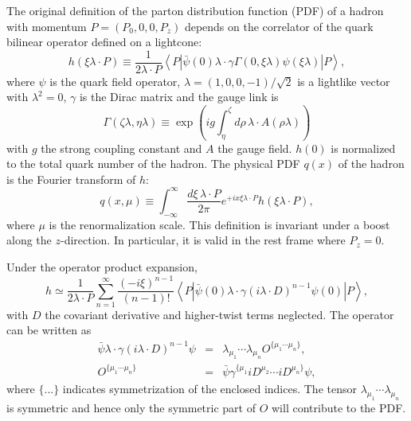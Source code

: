 
The original definition of the parton distribution function (PDF) of a
hadron with momentum $P=(P_0,0,0,P_z)$ depends on the correlator
of the quark bilinear operator defined on a lightcone:
%
\begin{equation}
h(\xi \lambda \cdot P) \equiv
  \frac{1}{2\lambda \cdot P}
  \left\langle P \left\vert
    \bar{\psi}(0) \lambda \cdot \gamma
    \Gamma \left(0,\xi \lambda \right) \psi(\xi \lambda)
  \right\vert P \right\rangle,  \label{eq:h-definition}
\end{equation}
%
where $\psi$ is the quark field operator, $\lambda=(1,0,0,-1)/\sqrt{2}$
is a lightlike vector with $\lambda^2=0$, $\gamma$ is the Dirac
matrix and the gauge link is
%
\begin{equation}
\Gamma \left( \zeta \lambda , \eta \lambda \right) \equiv
  \exp \left( ig \int_\eta^\zeta d\rho\,\lambda \cdot A(\rho \lambda) \right)
\end{equation}
%
with $g$ the strong coupling constant and $A$ the gauge field.
$h\left(0\right)$ is normalized to the total quark number of the hadron.
The physical PDF $q(x)$ of the hadron is the Fourier transform of $h$:
%
\begin{equation}
q(x,\mu) \equiv
  \int_{-\infty}^\infty \frac{d\xi \,\lambda \cdot P}{2\pi}
    e^{+ix \xi \lambda \cdot P} h(\xi \lambda \cdot P),  \label{one}
\end{equation}
%
where $\mu$ is the renormalization scale. This definition is invariant
under a boost along the $z$-direction. In particular, it is valid
in the rest frame where $P_z=0$.

Under the operator product expansion,
%
\begin{equation}
h \simeq
  \frac{1}{2\lambda \cdot P}
  \sum_{n=1}^\infty
    \frac{\left( -i\xi \right)^{n-1}}{\left( n-1 \right)!}
    \left\langle P \left\vert
    \bar{\psi}(0) \lambda \cdot \gamma \left( i\lambda \cdot D\right)^{n-1} \psi(0)
    \right\vert P\right\rangle,
\end{equation}
%
with $D$ the covariant derivative and higher-twist terms neglected.
The operator can be written as
%
\begin{eqnarray}
\bar{\psi} \lambda \cdot \gamma \left( i\lambda \cdot D\right)^{n-1} \psi &=&
  \lambda_{\mu_1} \cdots \lambda_{\mu_n} O^{\{\mu_1\cdots \mu_n\}},  \label{O1} \\
O^{\{\mu_1\cdots \mu_n\}} &=&
  \bar{\psi} \gamma^{\{\mu_1}iD^{\mu_2}\cdots iD^{\mu_n\}} \psi ,  \label{O2}
\end{eqnarray}
%
where $\{...\}$ indicates symmetrization of the enclosed indices.
The tensor $\lambda_{\mu_1}\cdots \lambda_{\mu_n}$ is symmetric and
hence only the symmetric part of $O$ will contribute to the PDF.

